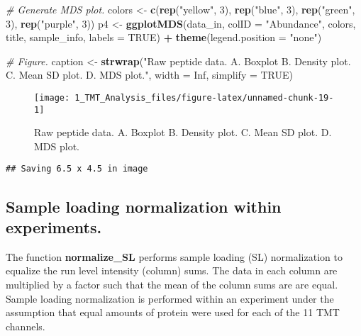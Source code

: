 \documentclass[]{article}
\newenvironment{Shaded}{\begin{snugshade}}{\end{snugshade}}
\newcommand{\KeywordTok}[1]{\textcolor[rgb]{0.13,0.29,0.53}{\textbf{#1}}}
\newcommand{\DataTypeTok}[1]{\textcolor[rgb]{0.13,0.29,0.53}{#1}}
\newcommand{\DecValTok}[1]{\textcolor[rgb]{0.00,0.00,0.81}{#1}}
\newcommand{\StringTok}[1]{\textcolor[rgb]{0.31,0.60,0.02}{#1}}
\newcommand{\CommentTok}[1]{\textcolor[rgb]{0.56,0.35,0.01}{\textit{#1}}}
\newcommand{\OtherTok}[1]{\textcolor[rgb]{0.56,0.35,0.01}{#1}}
\newcommand{\OperatorTok}[1]{\textcolor[rgb]{0.81,0.36,0.00}{\textbf{#1}}}
\newcommand{\NormalTok}[1]{#1}
\begin{document}
\begin{Shaded}
\begin{Highlighting}[]
\CommentTok{# Generate MDS plot.}
\NormalTok{colors <-}\StringTok{ }\KeywordTok{c}\NormalTok{(}\KeywordTok{rep}\NormalTok{(}\StringTok{"yellow"}\NormalTok{, }\DecValTok{3}\NormalTok{), }\KeywordTok{rep}\NormalTok{(}\StringTok{"blue"}\NormalTok{, }\DecValTok{3}\NormalTok{), }\KeywordTok{rep}\NormalTok{(}\StringTok{"green"}\NormalTok{, }\DecValTok{3}\NormalTok{), }\KeywordTok{rep}\NormalTok{(}\StringTok{"purple"}\NormalTok{, }\DecValTok{3}\NormalTok{))}
\NormalTok{p4 <-}\StringTok{ }\KeywordTok{ggplotMDS}\NormalTok{(data_in, }\DataTypeTok{colID =} \StringTok{"Abundance"}\NormalTok{, colors, title, sample_info, }\DataTypeTok{labels =} \OtherTok{TRUE}\NormalTok{) }\OperatorTok{+}
\StringTok{  }\KeywordTok{theme}\NormalTok{(}\DataTypeTok{legend.position =} \StringTok{"none"}\NormalTok{)}

\CommentTok{# Figure.}
\NormalTok{caption <-}\StringTok{ }\KeywordTok{strwrap}\NormalTok{(}\StringTok{"Raw peptide data. A. Boxplot B. Density plot. }
\StringTok{                   C. Mean SD plot. D. MDS plot."}\NormalTok{, }\DataTypeTok{width =} \OtherTok{Inf}\NormalTok{, }\DataTypeTok{simplify =} \OtherTok{TRUE}\NormalTok{)}
\end{Highlighting}
\end{Shaded}

\begin{figure}

{\centering \texttt{[image: 1\_TMT\_Analysis\_files/figure-latex/unnamed-chunk-19-1]} 

}

\caption{Raw peptide data. A. Boxplot B. Density plot.  C. Mean SD plot. D. MDS plot.}\label{fig:unnamed-chunk-19}
\end{figure}

\begin{verbatim}
## Saving 6.5 x 4.5 in image
\end{verbatim}

\subsection{Sample loading normalization within
experiments.}\label{sample-loading-normalization-within-experiments.}

The function \textbf{normalize\_SL} performs sample loading (SL)
normalization to equalize the run level intensity (column) sums. The
data in each column are multiplied by a factor such that the mean of the
column sums are are equal. Sample loading normalization is performed
within an experiment under the assumption that equal amounts of protein
were used for each of the 11 TMT channels.
\end{document}

